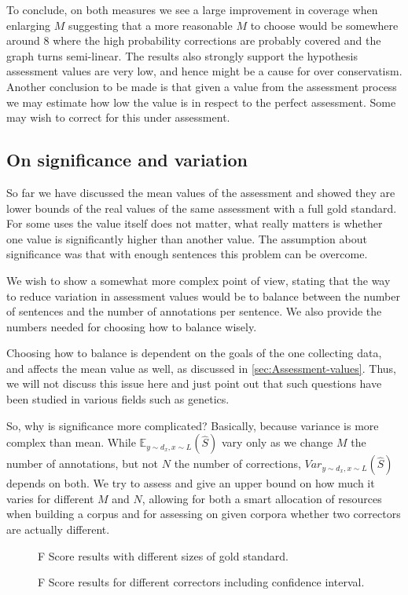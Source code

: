 \documentclass[english]{article}
\begin{document}
To conclude, on both measures we see a large improvement in coverage when enlarging $M$ suggesting that a more reasonable $M$ to choose would be somewhere around 8 where the high probability corrections are probably covered and the graph turns semi-linear. The results also strongly support the hypothesis assessment values are very low, and hence might be a cause for over conservatism.
 Another conclusion to be made is that given a value from the assessment process we may estimate how low the value is in respect to the perfect assessment. Some may wish to correct for this under assessment.

\subsection{On significance and variation}

So far we have discussed the mean values of the assessment and showed they are lower bounds of the real values of the same assessment with a full gold standard. For some uses the value itself does not matter, what really matters is whether one value is significantly higher than another value. The assumption about significance was that with enough sentences this problem can be overcome.

We wish to show a somewhat more complex point of view, stating that the way to reduce variation in assessment values would be to balance between the number of sentences and the number of annotations per sentence. We also provide the numbers needed for choosing how to balance wisely. 

Choosing how to balance is dependent on the goals of the one collecting data, and affects the mean value as well, as discussed in \ref{sec:Assessment-values}. Thus, we will not discuss this issue here and just point out that such questions have been studied in various fields such as genetics\cite{ionita2010optimal}.

So, why is significance more complicated? Basically, because variance is more complex than mean. While $\mathbb{E}_{y\sim d_x, x\sim L}\left(\hat{S}\right)$ vary only as we change $M$
the number of annotations, but not $N$ the number of corrections,
$Var_{y\sim d_x, x\sim L}(\hat{S})$ depends on both. We try to assess and give an upper
bound on how much it varies for different $M$ and $N$, allowing
for both a smart allocation of resources when building a corpus and for assessing on given corpora whether two correctors are actually different.

\begin{figure}
	\caption{F Score results with different sizes of gold standard.}
	\label{tab:F_Ms}
\end{figure}
\begin{figure}
	\caption{F Score results for different correctors including confidence interval.}
	\label{fig:F_correctors}
\end{figure}
\end{document}
